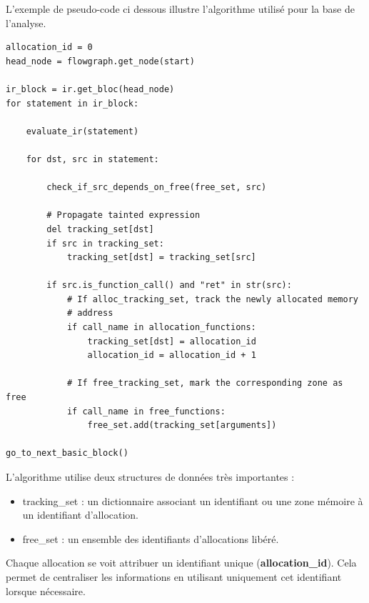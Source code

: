 L'exemple de pseudo-code ci dessous illustre l'algorithme utilisé pour la base de l'analyse.
\begin {lstlisting}[frame=single]
allocation_id = 0
head_node = flowgraph.get_node(start)

ir_block = ir.get_bloc(head_node)
for statement in ir_block:

    evaluate_ir(statement)

    for dst, src in statement:

        check_if_src_depends_on_free(free_set, src)

        # Propagate tainted expression
        del tracking_set[dst]
        if src in tracking_set:
            tracking_set[dst] = tracking_set[src]

        if src.is_function_call() and "ret" in str(src):
            # If alloc_tracking_set, track the newly allocated memory
            # address
            if call_name in allocation_functions:
                tracking_set[dst] = allocation_id
                allocation_id = allocation_id + 1

            # If free_tracking_set, mark the corresponding zone as free
            if call_name in free_functions:
                free_set.add(tracking_set[arguments])

go_to_next_basic_block()
\end{lstlisting}

L'algorithme utilise deux structures de données très importantes :

\begin{itemize}
        \item tracking\_set : un dictionnaire associant un identifiant ou une zone mémoire à un identifiant d'allocation.
        \item free\_set : un ensemble des identifiants d'allocations libéré.
\end{itemize}

Chaque allocation se voit attribuer un identifiant unique (\textbf{allocation\_id}). Cela permet de centraliser les informations
en utilisant uniquement cet identifiant lorsque nécessaire.

